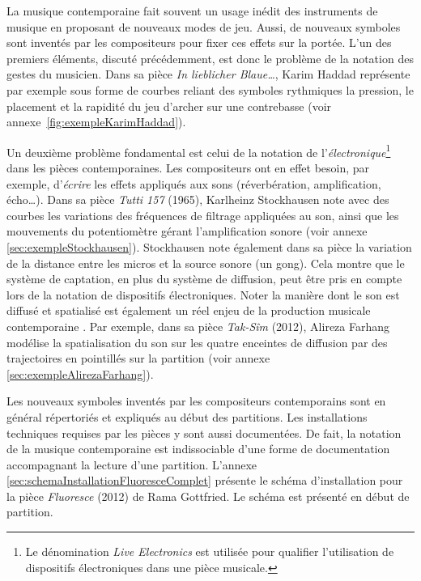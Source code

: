 La musique contemporaine fait souvent un usage inédit des instruments de musique en proposant de nouveaux modes de jeu. 
Aussi, de nouveaux symboles sont inventés par les compositeurs pour fixer ces effets sur la portée. 
%
L'un des premiers éléments, discuté précédemment, est donc le problème de la notation des gestes du musicien. 
Dans sa pièce \textit{In lieblicher Blaue…}, Karim Haddad représente par exemple sous forme de courbes reliant des symboles rythmiques la pression, le placement et la rapidité du jeu d'archer sur une contrebasse (voir annexe~\ref{fig:exempleKarimHaddad}).

Un deuxième problème fondamental est celui de la notation de l'\textit{électronique}\footnote{Le dénomination \textit{Live Electronics} est utilisée pour qualifier l'utilisation de dispositifs électroniques dans une pièce musicale.} dans les pièces contemporaines. 
Les compositeurs ont en effet besoin, par exemple, d'\textit{écrire} les effets appliqués aux sons (réverbération, amplification, écho…). 
Dans sa pièce \textit{Tutti 157} (1965), Karlheinz Stockhausen note avec des courbes les variations des fréquences de filtrage appliquées au son, ainsi que les mouvements du potentiomètre gérant l'amplification sonore (voir annexe \ref{sec:exempleStockhausen}). Stockhausen note également dans sa pièce la variation de la distance entre les micros et la source sonore (un gong). Cela montre que le système de captation, en plus du système de diffusion, peut être pris en compte lors de la notation de dispositifs électroniques.  
%
Noter la manière dont le son est diffusé et spatialisé est également un réel enjeu de la production musicale contemporaine \cite{ellberger2015}. 
Par exemple, dans sa pièce \textit{Tak-Sîm} (2012), Alireza Farhang modélise la spatialisation du son sur les quatre enceintes de diffusion par des trajectoires en pointillés sur la partition (voir annexe \ref{sec:exempleAlirezaFarhang}).

Les nouveaux symboles inventés par les compositeurs contemporains sont en général répertoriés et expliqués au début des partitions. Les installations techniques requises par les pièces y sont aussi documentées. De fait, la notation de la musique contemporaine est indissociable d'une forme de documentation accompagnant la lecture d'une partition. L'annexe \ref{sec:schemaInstallationFluoresceComplet} présente le schéma d'installation pour la pièce \textit{Fluoresce} (2012) de Rama Gottfried. Le schéma est présenté en début de partition.

